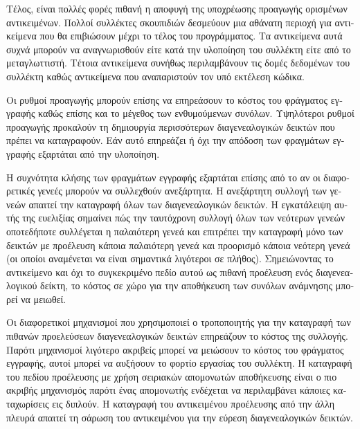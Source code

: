 \begin{greek}
Τέλος, είναι πολλές φορές πιθανή η αποφυγή της υποχρέωσης
προαγωγής ορισμένων αντικειμένων. Πολλοί συλλέκτες σκουπιδιών
δεσμεύουν μια αθάνατη περιοχή για αντικείμενα που θα επιβιώσουν
μέχρι το τέλος του προγράμματος. Τα αντικείμενα αυτά συχνά μπορούν
να αναγνωρισθούν είτε κατά την υλοποίηση του συλλέκτη είτε από
το μεταγλωττιστή. Τέτοια αντικείμενα συνήθως περιλαμβάνουν
τις δομές δεδομένων του συλλέκτη καθώς αντικείμενα που αναπαριστούν
τον υπό εκτέλεση κώδικα.

Οι ρυθμοί προαγωγής μπορούν επίσης να επηρεάσουν το κόστος του
φράγματος εγγραφής καθώς επίσης και το μέγεθος των ενθυμούμενων
συνόλων. Υψηλότεροι ρυθμοί προαγωγής προκαλούν τη δημιουργία
περισσότερων διαγενεαλογικών δεικτών που πρέπει να καταγραφούν.
Εάν αυτό επηρεάζει ή όχι την απόδοση των φραγμάτων εγγραφής
εξαρτάται από την υλοποίηση.

Η συχνότητα κλήσης των φραγμάτων εγγραφής εξαρτάται επίσης
από το αν οι διαφορετικές γενεές μπορούν να συλλεχθούν ανεξάρτητα.
Η ανεξάρτητη συλλογή των γενεών απαιτεί την καταγραφή όλων
των διαγενεαλογικών δεικτών. Η εγκατάλειψη αυτής της ευελιξίας
σημαίνει πώς την ταυτόχρονη συλλογή όλων των νεότερων γενεών
οποτεδήποτε συλλέγεται η παλαιότερη γενεά και επιτρέπει την
καταγραφή μόνο των δεικτών με προέλευση κάποια παλαιότερη
γενεά και προορισμό κάποια νεότερη γενεά (οι οποίοι αναμένεται
να είναι σημαντικά λιγότεροι σε πλήθος). Σημειώνοντας το
αντικείμενο και όχι το συγκεκριμένο πεδίο αυτού ως πιθανή
προέλευση ενός διαγενεαλογικού δείκτη, το κόστος σε χώρο για
την αποθήκευση των συνόλων ανάμνησης μπορεί να μειωθεί.

Οι διαφορετικοί μηχανισμοί που χρησιμοποιεί ο τροποποιητής για
την καταγραφή των πιθανών προελεύσεων διαγενεαλογικών δεικτών
επηρεάζουν το κόστος της συλλογής. Παρότι μηχανισμοί λιγότερο
ακριβείς μπορεί να μειώσουν το κόστος του φράγματος εγγραφής,
αυτοί μπορεί να αυξήσουν το φορτίο εργασίας του συλλέκτη.
Η καταγραφή του πεδίου προέλευσης με χρήση σειριακών απομονωτών
αποθήκευσης είναι ο πιο ακριβής μηχανισμός παρότι ένας απομονωτής
ενδέχεται να περιλαμβάνει κάποιες καταχωρίσεις εις διπλούν.
Η καταγραφή του αντικειμένου προέλευσης από την άλλη πλευρά
απαιτεί τη σάρωση του αντικειμένου για την εύρεση διαγενεαλογικών
δεικτών.

\end{greek}
